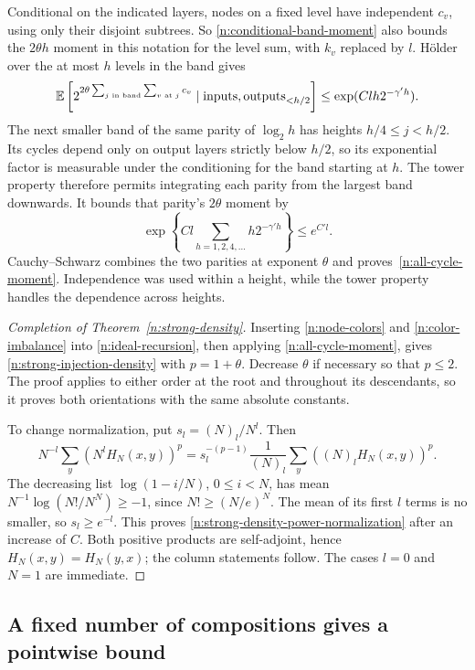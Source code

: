 Conditional on the indicated layers, nodes on a fixed level have independent \(c_v\), using only their disjoint subtrees. So \eqref{n:conditional-band-moment} also bounds the \(2\theta h\) moment in this notation for the level sum, with \(k_v\) replaced by \(l\). H\"older over the at most \(h\) levels in the band gives
\[
\mathbb E\left[2^{2\theta\sum_{j\text{ in band}}\sum_{v\text{ at }j}c_v}\mid
{\rm inputs}, {\rm outputs}_{<h/2}\right]\le \exp(C l h 2^{-\gamma' h}).
\]
The next smaller band of the same parity of $\log_2h$ has heights
$h/4\le j<h/2$.  Its cycles depend only on output layers strictly
below $h/2$, so its exponential factor is measurable under the
conditioning for the band starting at $h$.  The tower property
therefore permits integrating each parity from the largest band
downwards.  It bounds that parity's $2\theta$ moment by
\[
 \exp\left\{Cl\sum_{h=1,2,4,\ldots}h2^{-\gamma'h}\right\}
 \le e^{C'l}.
\]
Cauchy--Schwarz combines the two parities at exponent $\theta$ and
proves~\eqref{n:all-cycle-moment}.  Independence was used within a
height, while the tower property handles the dependence across
heights.

\begin{proof}[Completion of Theorem~\ref{n:strong-density}]
Inserting \eqref{n:node-colors} and \eqref{n:color-imbalance} into
\eqref{n:ideal-recursion}, then applying \eqref{n:all-cycle-moment},
gives \eqref{n:strong-injection-density} with $p=1+\theta$.
Decrease $\theta$ if necessary so that $p\le2$.  The proof applies
to either order at the root and throughout its descendants, so it
proves both orientations with the same absolute constants.

To change normalization, put $s_l=(N)_l/N^l$.  Then
\[
 N^{-l}\sum_y(N^lH_N(x,y))^p
 =s_l^{-(p-1)}\frac1{(N)_l}
       \sum_y((N)_lH_N(x,y))^p.
\]
The decreasing list $\log(1-i/N)$, $0\le i<N$, has mean
$N^{-1}\log(N!/N^N)\ge-1$, since $N!\ge(N/e)^N$.
The mean of its first $l$ terms is no smaller, so $s_l\ge e^{-l}$.
This proves \eqref{n:strong-density-power-normalization} after an
increase of $C$.  Both positive products are self-adjoint, hence
$H_N(x,y)=H_N(y,x)$; the column statements follow.  The cases
$l=0$ and $N=1$ are immediate.
\end{proof}

\subsection{A fixed number of compositions gives a pointwise bound}


